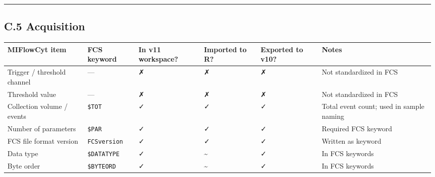 \documentclass[
]{article}
\begin{document}
\begin{center}\rule{0.5\linewidth}{0.5pt}\end{center}

\subsection{C.5 Acquisition}\label{c.5-acquisition}

\begin{longtable}[]{@{}
  >{\raggedright\arraybackslash}p{}
  >{\raggedright\arraybackslash}p{}
  >{\raggedright\arraybackslash}p{}
  >{\raggedright\arraybackslash}p{}
  >{\raggedright\arraybackslash}p{}
  >{\raggedright\arraybackslash}p{}@{}}
\toprule\noalign{}
\begin{minipage}[b]{\linewidth}\raggedright
MIFlowCyt item
\end{minipage} & \begin{minipage}[b]{\linewidth}\raggedright
FCS keyword
\end{minipage} & \begin{minipage}[b]{\linewidth}\raggedright
In v11 workspace?
\end{minipage} & \begin{minipage}[b]{\linewidth}\raggedright
Imported to R?
\end{minipage} & \begin{minipage}[b]{\linewidth}\raggedright
Exported to v10?
\end{minipage} & \begin{minipage}[b]{\linewidth}\raggedright
Notes
\end{minipage} \\
\midrule\noalign{}
\endhead
\bottomrule\noalign{}
\endlastfoot
Trigger / threshold channel & --- & ✗ & ✗ & ✗ & Not standardized in
FCS \\
Threshold value & --- & ✗ & ✗ & ✗ & Not standardized in FCS \\
Collection volume / events & \texttt{\$TOT} & ✓ & ✓ & ✓ & Total event
count; used in sample naming \\
Number of parameters & \texttt{\$PAR} & ✓ & ✓ & ✓ & Required FCS
keyword \\
FCS file format version & \texttt{FCSversion} & ✓ & ✓ & ✓ & Written as
keyword \\
Data type & \texttt{\$DATATYPE} & ✓ & \textasciitilde{} & ✓ & In FCS
keywords \\
Byte order & \texttt{\$BYTEORD} & ✓ & \textasciitilde{} & ✓ & In FCS
keywords \\
\end{longtable}
\end{document}
